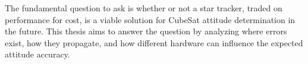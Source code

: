 \par \qquad The fundamental question to ask is whether or not a star tracker, traded on performance for cost, is a viable solution for CubeSat attitude determination in the future.
This thesis aims to answer the question by analyzing where errors exist, how they propagate, and how different hardware can influence the expected attitude accuracy.


